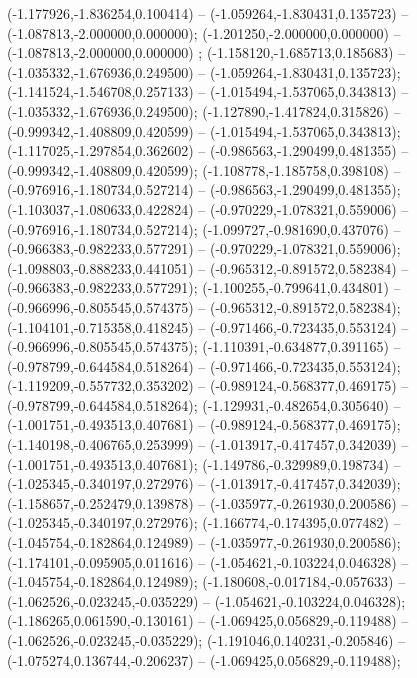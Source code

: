  (-1.177926,-1.836254,0.100414) -- (-1.059264,-1.830431,0.135723) -- (-1.087813,-2.000000,0.000000);
 (-1.201250,-2.000000,0.000000) -- (-1.087813,-2.000000,0.000000) ;
 (-1.158120,-1.685713,0.185683) -- (-1.035332,-1.676936,0.249500) -- (-1.059264,-1.830431,0.135723);
 (-1.141524,-1.546708,0.257133) -- (-1.015494,-1.537065,0.343813) -- (-1.035332,-1.676936,0.249500);
 (-1.127890,-1.417824,0.315826) -- (-0.999342,-1.408809,0.420599) -- (-1.015494,-1.537065,0.343813);
 (-1.117025,-1.297854,0.362602) -- (-0.986563,-1.290499,0.481355) -- (-0.999342,-1.408809,0.420599);
 (-1.108778,-1.185758,0.398108) -- (-0.976916,-1.180734,0.527214) -- (-0.986563,-1.290499,0.481355);
 (-1.103037,-1.080633,0.422824) -- (-0.970229,-1.078321,0.559006) -- (-0.976916,-1.180734,0.527214);
 (-1.099727,-0.981690,0.437076) -- (-0.966383,-0.982233,0.577291) -- (-0.970229,-1.078321,0.559006);
 (-1.098803,-0.888233,0.441051) -- (-0.965312,-0.891572,0.582384) -- (-0.966383,-0.982233,0.577291);
 (-1.100255,-0.799641,0.434801) -- (-0.966996,-0.805545,0.574375) -- (-0.965312,-0.891572,0.582384);
 (-1.104101,-0.715358,0.418245) -- (-0.971466,-0.723435,0.553124) -- (-0.966996,-0.805545,0.574375);
 (-1.110391,-0.634877,0.391165) -- (-0.978799,-0.644584,0.518264) -- (-0.971466,-0.723435,0.553124);
 (-1.119209,-0.557732,0.353202) -- (-0.989124,-0.568377,0.469175) -- (-0.978799,-0.644584,0.518264);
 (-1.129931,-0.482654,0.305640) -- (-1.001751,-0.493513,0.407681) -- (-0.989124,-0.568377,0.469175);
 (-1.140198,-0.406765,0.253999) -- (-1.013917,-0.417457,0.342039) -- (-1.001751,-0.493513,0.407681);
 (-1.149786,-0.329989,0.198734) -- (-1.025345,-0.340197,0.272976) -- (-1.013917,-0.417457,0.342039);
 (-1.158657,-0.252479,0.139878) -- (-1.035977,-0.261930,0.200586) -- (-1.025345,-0.340197,0.272976);
 (-1.166774,-0.174395,0.077482) -- (-1.045754,-0.182864,0.124989) -- (-1.035977,-0.261930,0.200586);
 (-1.174101,-0.095905,0.011616) -- (-1.054621,-0.103224,0.046328) -- (-1.045754,-0.182864,0.124989);
 (-1.180608,-0.017184,-0.057633) -- (-1.062526,-0.023245,-0.035229) -- (-1.054621,-0.103224,0.046328);
 (-1.186265,0.061590,-0.130161) -- (-1.069425,0.056829,-0.119488) -- (-1.062526,-0.023245,-0.035229);
 (-1.191046,0.140231,-0.205846) -- (-1.075274,0.136744,-0.206237) -- (-1.069425,0.056829,-0.119488);
